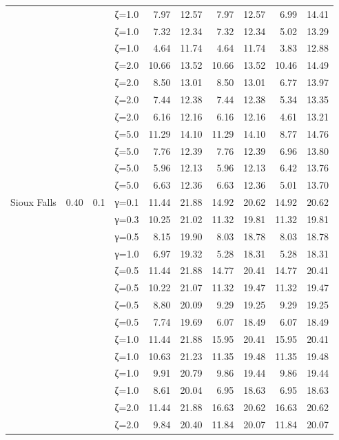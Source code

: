 \begin{table}[htbp]
\begin{tabular}{ll r l  rr  rr  rr}
  &  &  & ζ=1.0 & 7.97 & 12.57 & 7.97 & 12.57 & 6.99 & 14.41 \\
  &  &  & ζ=1.0 & 7.32 & 12.34 & 7.32 & 12.34 & 5.02 & 13.29 \\
  &  &  & ζ=1.0 & 4.64 & 11.74 & 4.64 & 11.74 & 3.83 & 12.88 \\
  &  &  & ζ=2.0 & 10.66 & 13.52 & 10.66 & 13.52 & 10.46 & 14.49 \\
  &  &  & ζ=2.0 & 8.50 & 13.01 & 8.50 & 13.01 & 6.77 & 13.97 \\
  &  &  & ζ=2.0 & 7.44 & 12.38 & 7.44 & 12.38 & 5.34 & 13.35 \\
  &  &  & ζ=2.0 & 6.16 & 12.16 & 6.16 & 12.16 & 4.61 & 13.21 \\
  &  &  & ζ=5.0 & 11.29 & 14.10 & 11.29 & 14.10 & 8.77 & 14.76 \\
  &  &  & ζ=5.0 & 7.76 & 12.39 & 7.76 & 12.39 & 6.96 & 13.80 \\
  &  &  & ζ=5.0 & 5.96 & 12.13 & 5.96 & 12.13 & 6.42 & 13.76 \\
  &  &  & ζ=5.0 & 6.63 & 12.36 & 6.63 & 12.36 & 5.01 & 13.70 \\
\midrule
 Sioux Falls & 0.40 & 0.1 & γ=0.1 & 11.44 & 21.88 & 14.92 & 20.62 & 14.92 & 20.62 \\
  &  &  & γ=0.3 & 10.25 & 21.02 & 11.32 & 19.81 & 11.32 & 19.81 \\
  &  &  & γ=0.5 & 8.15 & 19.90 & 8.03 & 18.78 & 8.03 & 18.78 \\
  &  &  & γ=1.0 & 6.97 & 19.32 & 5.28 & 18.31 & 5.28 & 18.31 \\
  &  &  & ζ=0.5 & 11.44 & 21.88 & 14.77 & 20.41 & 14.77 & 20.41 \\
  &  &  & ζ=0.5 & 10.22 & 21.07 & 11.32 & 19.47 & 11.32 & 19.47 \\
  &  &  & ζ=0.5 & 8.80 & 20.09 & 9.29 & 19.25 & 9.29 & 19.25 \\
  &  &  & ζ=0.5 & 7.74 & 19.69 & 6.07 & 18.49 & 6.07 & 18.49 \\
  &  &  & ζ=1.0 & 11.44 & 21.88 & 15.95 & 20.41 & 15.95 & 20.41 \\
  &  &  & ζ=1.0 & 10.63 & 21.23 & 11.35 & 19.48 & 11.35 & 19.48 \\
  &  &  & ζ=1.0 & 9.91 & 20.79 & 9.86 & 19.44 & 9.86 & 19.44 \\
  &  &  & ζ=1.0 & 8.61 & 20.04 & 6.95 & 18.63 & 6.95 & 18.63 \\
  &  &  & ζ=2.0 & 11.44 & 21.88 & 16.63 & 20.62 & 16.63 & 20.62 \\
  &  &  & ζ=2.0 & 9.84 & 20.40 & 11.84 & 20.07 & 11.84 & 20.07 \\

\end{tabular}
\end{table}
